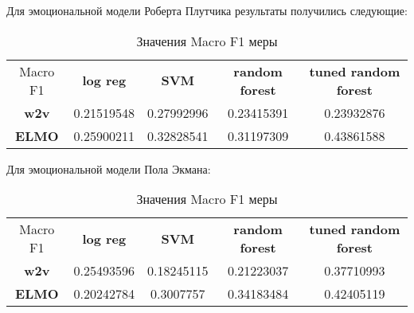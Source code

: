 Для эмоциональной модели Роберта Плутчика результаты получились следующие:

\bigskip
\begin{table}[ht]
\caption{Значения Macro F1 меры}
\label{tab:plutchik}
\centering
\begin{tabular}{ccccc}
Macro F1 & \textbf{log reg} & \textbf{SVM} & \textbf{random forest} & \textbf{tuned random forest}\\
\textbf{w2v} & 0.21519548 & 0.27992996 & 0.23415391 & 0.23932876\\
\textbf{ELMO} & 0.25900211 & 0.32828541 & 0.31197309 & 0.43861588
\end{tabular}
\end{table}


Для эмоциональной модели Пола Экмана:

\bigskip
\begin{table}[ht]
\caption{Значения Macro F1 меры}
\label{tab:ekman}
\centering
\begin{tabular}{ccccc}
Macro F1 & \textbf{log reg} & \textbf{SVM} & \textbf{random forest} & \textbf{tuned random forest}\\
\textbf{w2v} & 0.25493596 & 0.18245115 & 0.21223037 & 0.37710993 \\
\textbf{ELMO}& 0.20242784 & 0.3007757 & 0.34183484 & 0.42405119
\end{tabular}
\end{table}
